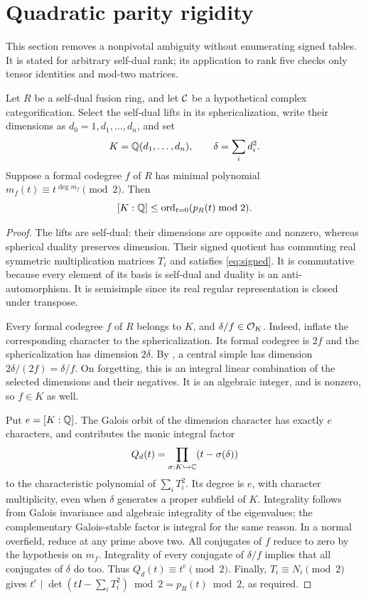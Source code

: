 \section{Quadratic parity rigidity}\label{sec:parity}
This section removes a nonpivotal ambiguity without enumerating signed
tables. It is stated for arbitrary self-dual rank; its application to
rank five checks only tensor identities and mod-two matrices.

\begin{lemma}\label{lem:spectral}
Let $R$ be a self-dual fusion ring, and let $\mathcal C$ be a hypothetical complex
categorification. Select the self-dual lifts in its sphericalization,
write their dimensions as $d_0=1,d_1,\ldots,d_n$, and set
\[
 K=\mathbb Q(d_1,\ldots,d_n),\qquad \delta=\sum_i d_i^2.
\]
Suppose a formal codegree $f$ of $R$ has minimal polynomial
$m_f(t)\equiv t^{\deg m_f}\pmod2$.
Then
\[
 [K:\mathbb Q]\le\operatorname{ord}_{t=0}(p_R(t)\bmod2).
\]
\end{lemma}
\begin{proof}
The lifts are self-dual: their dimensions are opposite and nonzero,
whereas spherical duality preserves dimension. Their signed quotient
has commuting real symmetric multiplication matrices $T_i$ and satisfies
\eqref{eq:signed}. It is commutative because every element of its basis
is self-dual and duality is an anti-automorphism. It is semisimple since
its real regular representation is closed under transpose.

Every formal codegree $f$ of $R$ belongs to $K$, and $\delta/f\in\mathcal O_K$.
Indeed, inflate the corresponding character to the sphericalization.
Its formal codegree is $2f$ and the sphericalization has dimension
$2\delta$. By \cite[Theorem 2.13]{Ostrik}, a central simple has dimension
$2\delta/(2f)=\delta/f$. On forgetting, this is an integral linear
combination of the selected dimensions and their negatives. It is an
algebraic integer, and is nonzero, so $f\in K$ as well.

Put $e=[K:\mathbb Q]$. The Galois orbit of the dimension character has exactly
$e$ characters, and contributes the monic integral factor
\begin{equation}\label{eq:orbit-factor}
 Q_d(t)=\prod_{\sigma:K\hookrightarrow\mathbb C}(t-\sigma(\delta))
\end{equation}
to the characteristic polynomial of $\sum_iT_i^2$.
Its degree is $e$, with character multiplicity, even when $\delta$
generates a proper subfield of $K$. Integrality follows from Galois
invariance and algebraic integrality of the eigenvalues; the complementary
Galois-stable factor is integral for the same reason.
In a normal overfield, reduce at any prime above two. All conjugates of
$f$ reduce to zero by the hypothesis on $m_f$. Integrality of every
conjugate of $\delta/f$ implies that all conjugates of $\delta$ do too.
Thus $Q_d(t)\equiv t^e\pmod2$.
Finally, $T_i\equiv N_i\pmod2$ gives
$t^e\mid\det(tI-\sum_iT_i^2)\bmod2=p_R(t)\bmod2$, as required.
\end{proof}

